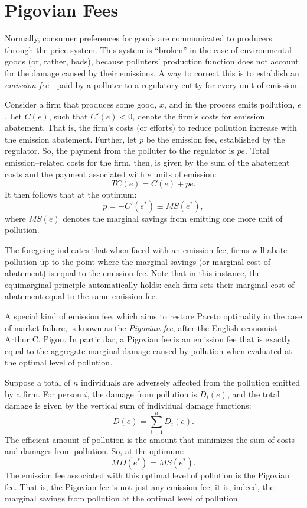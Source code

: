 \documentclass[
]{book}
\begin{document}
\hypertarget{pigovian-fees}{%
\section{Pigovian Fees}\label{pigovian-fees}}

Normally, consumer preferences for goods are communicated to producers through the price system. This system is ``broken'' in the case of environmental goods (or, rather, bads), because polluters' production function does not account for the damage caused by their emissions. A way to correct this is to establish an \emph{emission fee}---paid by a polluter to a regulatory entity for every unit of emission.

Consider a firm that produces some good, \(x\), and in the process emits pollution, \(e\). Let \(C(e)\), such that \(C'(e)<0\), denote the firm's costs for emission abatement. That is, the firm's costs (or efforts) to reduce pollution increase with the emission abatement. Further, let \(p\) be the emission fee, established by the regulator. So, the payment from the polluter to the regulator is \(pe\). Total emission--related costs for the firm, then, is given by the sum of the abatement costs and the payment associated with \(e\) units of emission: \[TC(e) = C(e)+pe.\] It then follows that at the optimum: \[p=-C'(e^*) \equiv MS(e^*),\] where \(MS(e)\) denotes the marginal savings from emitting one more unit of pollution.

The foregoing indicates that when faced with an emission fee, firms will abate pollution up to the point where the marginal savings (or marginal cost of abatement) is equal to the emission fee. Note that in this instance, the equimarginal principle automatically holds: each firm sets their marginal cost of abatement equal to the same emission fee.

A special kind of emission fee, which aims to restore Pareto optimality in the case of market failure, is known as the \emph{Pigovian fee}, after the English economist Arthur C. Pigou. In particular, a Pigovian fee is an emission fee that is exactly equal to the aggregate marginal damage caused by pollution when evaluated at the optimal level of pollution.

Suppose a total of \(n\) individuals are adversely affected from the pollution emitted by a firm. For person \(i\), the damage from pollution is \(D_i(e)\), and the total damage is given by the vertical sum of individual damage functions: \[D(e) = \sum_{i=1}^{n}D_i(e).\] The efficient amount of pollution is the amount that minimizes the sum of costs and damages from pollution. So, at the optimum: \[MD(e^*) = MS(e^*).\] The emission fee associated with this optimal level of pollution is the Pigovian fee. That is, the Pigovian fee is not just any emission fee; it is, indeed, the marginal savings from pollution at the optimal level of pollution.
\end{document}
